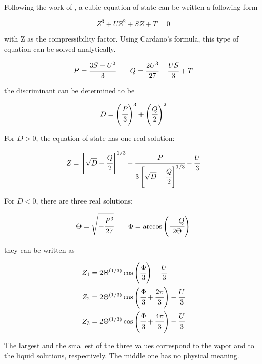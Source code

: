 \documentclass[../Article_Model_Parameters.tex]{subfiles}
\begin{document}
	
	Following the work of \citet{Gmehling2019}, a cubic equation of state can be written a following form
	
	{\footnotesize
		\begin{equation}
			Z^3 + UZ^2+ SZ + T = 0
		\end{equation}
	}

	with Z as the compressibility factor. Using Cardano's formula, this type of equation can be solved analytically.
	
	{\footnotesize
		\begin{equation*}
			P = \cfrac{3S-U^2}{3} \qquad Q = \cfrac{2U^3}{27}-\cfrac{US}{3} + T
		\end{equation*}
	}

	the discriminant can be determined to be
	
	{\footnotesize
		\begin{equation}
			D = \left( \cfrac{P}{3} \right)^3 + \left( \cfrac{Q}{2} \right)^2
		\end{equation}
	}

	For $D>0$, the equation of state has one real solution:
	
	{\footnotesize
		\begin{equation}
			Z = \left[ \sqrt{D} - \cfrac{Q}{2} \right]^{1/3} - \cfrac{P}{ 3 \left[ \sqrt{D}-\cfrac{Q}{2} \right]^{1/3} } - \cfrac{U}{3}
		\end{equation}
	}

	For $D<0$, there are three real solutions:
	
	{\footnotesize
		\begin{equation*}
			\Theta = \sqrt{-\cfrac{P^3}{27}} \qquad \Phi = \arccos\left( \cfrac{-Q}{2\Theta} \right)
		\end{equation*}
	}

	they can be written as
	
	{\footnotesize
		\begin{align}
			Z_1 &= 2\Theta^{(1/3)} \cos \left( \cfrac{\Phi}{3} \right) - \cfrac{U}{3} \\
			Z_2 &= 2\Theta^{(1/3)} \cos \left( \cfrac{\Phi}{3} + \cfrac{2\pi}{3} \right) - \cfrac{U}{3} \\
			Z_3 &= 2\Theta^{(1/3)} \cos \left( \cfrac{\Phi}{3} + \cfrac{4\pi}{3} \right) - \cfrac{U}{3} 
		\end{align}
	}
	
	The largest and the smallest of the three values correspond to the vapor and to	the liquid solutions, respectively. The middle one has no physical meaning.
	
\end{document}
